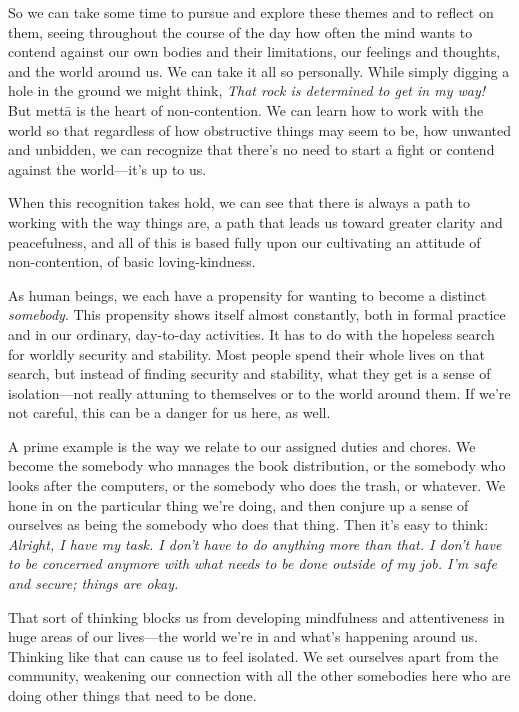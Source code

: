 So we can take some time to pursue and explore these themes and to 
reflect on them, seeing throughout the course of the day how often the 
mind wants to contend against our own bodies and their limitations, our 
feelings and thoughts, and the world around us. We can take it all so 
personally. While simply digging a hole in the ground we might think, 
\emph{That rock is determined to get in my way!} But mettā is the 
heart of non-contention. We can learn how to work with the world so 
that regardless of how obstructive things may seem to be, how unwanted 
and unbidden, we can recognize that there's no need to start a fight or 
contend against the world---it's up to us.

When this recognition takes hold, we can see that there is always a 
path to working with the way things are, a path that leads us toward 
greater clarity and peacefulness, and all of this is based fully upon 
our cultivating an attitude of non-contention, of basic loving-kindness.


As human beings, we each have a propensity for wanting to become a 
distinct \emph{somebody}. This propensity shows itself almost 
constantly, both in formal practice and in our ordinary, day-to-day 
activities. It has to do with the hopeless search for worldly security 
and stability. Most people spend their whole lives on that search, but 
instead of finding security and stability, what they get is a sense of 
isolation---not really attuning to themselves or to the world around 
them. If we're not careful, this can be a danger for us here, as well.

A prime example is the way we relate to our assigned duties and chores. 
We become the somebody who manages the book distribution, or the 
somebody who looks after the computers, or the somebody who does the 
trash, or whatever. We hone in on the particular thing we're doing, and 
then conjure up a sense of ourselves as being the somebody who does 
that thing. Then it's easy to think: \emph{Alright, I have my task. I 
don't have to do anything more than that. I don't have to be concerned 
anymore with what needs to be done outside of my job. I'm safe and 
secure; things are okay.}

That sort of thinking blocks us from developing mindfulness and 
attentiveness in huge areas of our lives---the world we're in and 
what's happening around us. Thinking like that can cause us to feel 
isolated. We set ourselves apart from the community, weakening our 
connection with all the other somebodies here who are doing other 
things that need to be done.

